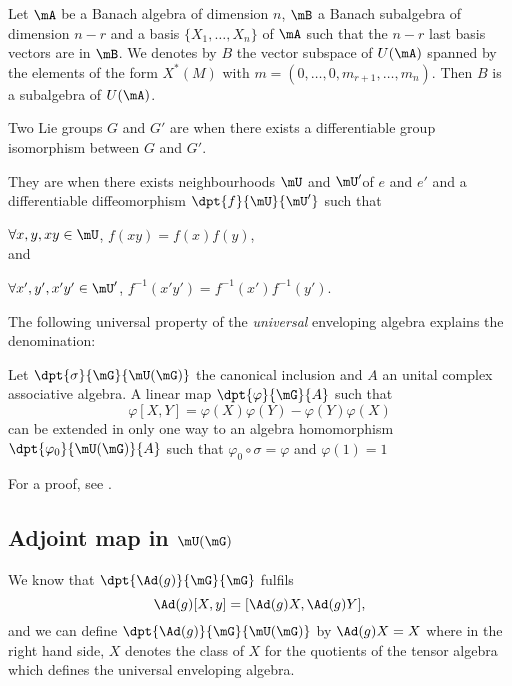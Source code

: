 \begin{corollary} \label{cor:/24}
    Let $\mA$ be a Banach algebra of dimension $n$, $\mB$ a Banach subalgebra of dimension $n-r$ and a basis $\{X_1,\ldots,X_n\}$ of $\mA$ such that the $n-r$ last basis vectors are in $\mB$. We denotes by $B$ the vector subspace of $U(\mA)$ spanned by the elements of the form $X^*(M)$ with $m=(0,\ldots,0,m_{r+1},\ldots,m_n)$. Then $B$ is a subalgebra of $U(\mA)$.
\end{corollary}

\begin{definition}
Two Lie groups $G$ and $G'$ are  when there exists a differentiable group isomorphism between $G$ and $G'$.

They are  when there exists neighbourhoods $\mU$ and $\mU'$of $e$ and $e'$ and a differentiable diffeomorphism $\dpt{f}{\mU}{\mU'}$ such that

$\forall x,y,xy\in\mU$, $f(xy)=f(x)f(y)$, \\and

$\forall x',y',x'y'\in\mU'$, $f^{-1}(x'y')=f^{-1}(x')f^{-1}(y')$.
\end{definition}

The following universal property of the \emph{universal} enveloping algebra explains the denomination:
\begin{proposition}
Let $\dpt{\sigma}{\mG}{\mU(\mG)}$ the canonical inclusion and $A$ an unital complex associative algebra. A linear map $\dpt{\varphi}{\mG}{A}$ such that
\begin{equation}
\varphi[X,Y]=\varphi(X)\varphi(Y)-\varphi(Y)\varphi(X)
\end{equation}
can be extended in only one way to an algebra homomorphism $\dpt{\varphi_0}{\mU(\mG)}{A}$ such that $\varphi_0\circ\sigma=\varphi$ and $\varphi(1)=1$
\label{prop:extunifmap}
\end{proposition}
For a proof, see \cite{Knapp_reprez}.

\subsection{Adjoint map in \texorpdfstring{$\mU(\mG)$}{U(G)}}   \label{ssadjunif}

We know that $\dpt{ \Ad(g) }{ \mG }{ \mG }$ fulfils
\[
  \Ad(g)[X,y]=[  \Ad(g)X,\Ad(g)Y  ],
\]
and we can define $\dpt{ \Ad(g) }{ \mG }{ \mU(\mG) }$ by $\Ad(g)X=X$ where in the right hand side, $X$ denotes the class of $X$ for the quotients of the tensor algebra which defines the universal enveloping algebra.

